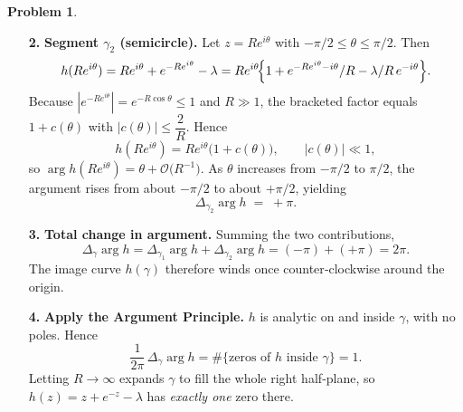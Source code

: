 \documentclass[12pt]{article}
\theoremstyle{definition} %
\newtheorem{problem}{Problem}
\theoremstyle{plain} %
\begin{document}
\begin{problem}
\begin{enumerate}
    \item[\textbf{2.}] \textbf{Segment $\gamma_2$ (semicircle).}\;
          Let $z=Re^{i\theta}$ with $-\pi/2\le\theta\le\pi/2$.
          Then
          \[
              h(Re^{i\theta})
              =Re^{i\theta}+e^{-Re^{i\theta}}-\lambda
              =Re^{i\theta}\!\Bigl\{1+e^{-Re^{i\theta}-i\theta}/R-\lambda/R\,e^{-i\theta}\Bigr\}.
          \]
          Because $|e^{-Re^{i\theta}}|=e^{-R\cos\theta}\le1$ and $R\gg1$,
          the bracketed factor equals $1+c(\theta)$ with $|c(\theta)|\le \dfrac{2}{R}$.
          Hence
          \[
              h(Re^{i\theta}) = Re^{i\theta}\bigl(1+c(\theta)\bigr),
              \qquad |c(\theta)|\ll1,
          \]
          so $\arg h(Re^{i\theta})=\theta+\mathcal O\!\bigl(R^{-1}\bigr)$.
          As $\theta$ increases from $-\pi/2$ to $\pi/2$, the argument rises from
          about $-\pi/2$ to about $+\pi/2$, yielding
          \[
              \Delta_{\gamma_2}\arg h \;=\; +\pi.
          \]

    \item[\textbf{3.}] \textbf{Total change in argument.}\;
          Summing the two contributions,
          \[
              \Delta_\gamma\arg h
              =\Delta_{\gamma_1}\arg h+\Delta_{\gamma_2}\arg h
              =(-\pi)+(+\pi)=2\pi.
          \]
          The image curve $h(\gamma)$ therefore winds once
          counter‑clockwise around the origin.

    \item[\textbf{4.}] \textbf{Apply the Argument Principle.}\;
          $h$ is analytic on and inside $\gamma$, with no poles.
          Hence
          \[
              \frac{1}{2\pi}\,\Delta_\gamma\arg h
              =\#\{\text{zeros of }h \text{ inside }\gamma\}=1.
          \]
          Letting $R\to\infty$ expands $\gamma$ to fill the whole right half‑plane,
          so $h(z)=z+e^{-z}-\lambda$ has \emph{exactly one} zero there.
    \end{enumerate}
\end{problem}
\end{document}
